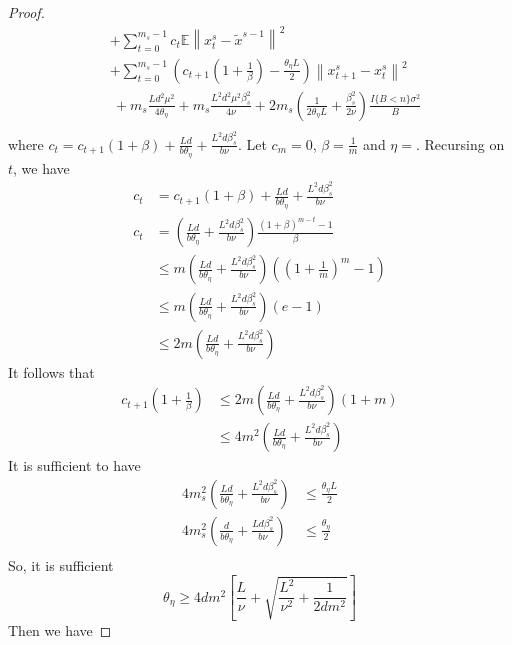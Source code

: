 \documentclass{article}
\newcommand*{\E}{\mathbb{E}}
\newcommand{\norm}[1]{\left\lVert#1\right\rVert}
\theoremstyle{definition}
\theoremstyle{remark}
\begin{document}
{\begin{proof}
\begin{equation}
\begin{split}
&+ \sum_{t=0}^{m_s-1} c_t\E\norm{x_t^s-\widetilde{x}^{s-1}}^2\\
&+\sum_{t=0}^{m_s-1}(c_{t+1}(1+\frac{1}{\beta})-\frac{\theta_{\eta} L}{2})\norm{x_{t+1}^s-x_{t}^s}^2\\
&~+m_s\frac{Ld^2\mu^2}{4\theta_{\eta}}+m_s\frac{ L^2d^2\mu^2\beta_s^2}{4\nu}+2m_s(\frac{1}{2\theta_{\eta} L}+\frac{\beta_s^2}{2\nu})\frac{I\{B < n\} \sigma ^2}{B}\\
\end{split}
\end{equation}
where $c_t = c_{t+1}(1+{\beta})+\frac{Ld}{b\theta_{\eta}}+\frac{L^2d\beta_s^2}{b\nu}$. {\color{red} Let $c_m=0$, $\beta=\frac{1}{m}$ and $\eta = $}. Recursing on $t$, we have 
\begin{equation}
\begin{split}
c_t &= c_{t+1}(1+{\beta})+\frac{Ld}{b\theta_{\eta}}+\frac{L^2d\beta_s^2}{b\nu} \\
c_t &= (\frac{Ld}{b\theta_{\eta}}+\frac{L^2d\beta_s^2}{b\nu }) \frac{(1+\beta)^{m-t}-1}{\beta} \\
&\leq m(\frac{Ld}{b\theta_{\eta}}+\frac{L^2d\beta_s^2}{b\nu })((1+\frac{1}{m})^m-1)\\
&\leq m(\frac{Ld}{b\theta_{\eta} }+\frac{L^2d\beta_s^2}{b\nu })(e-1)\\
&\leq 2m(\frac{Ld}{b\theta_{\eta} }+\frac{L^2d\beta_s^2}{b\nu })
\end{split}
\end{equation}
It follows that 
\begin{equation}
\begin{split}
c_{t+1}(1+\frac{1}{\beta})&\leq 2m(\frac{Ld}{b\theta_{\eta} }+\frac{L^2d\beta_s^2}{b\nu })(1+m)\\
&\leq 4m^2(\frac{Ld}{b\theta_{\eta} }+\frac{L^2d\beta_s^2}{b\nu })
\end{split}
\end{equation}
It is sufficient to have
\begin{equation}
\begin{split}
 4m_s^2(\frac{Ld}{b\theta_{\eta} }+\frac{L^2d\beta_s^2}{b\nu }) &\leq \frac{\theta_{\eta} L}{2}\\
  4m_s^2(\frac{d}{b\theta_{\eta} }+\frac{Ld\beta_s^2}{b\nu }) &\leq \frac{\theta_{\eta}}{2}\\
\end{split}
\end{equation}
So, it is sufficient
\[
\theta_\eta \geq 4 dm^2 \left[ \frac{L}{\nu}+\sqrt{\frac{L^2}{\nu^2}+\frac{1}{2dm^2}}\right]
\]
Then we have 

\end{proof}}
\end{document}
